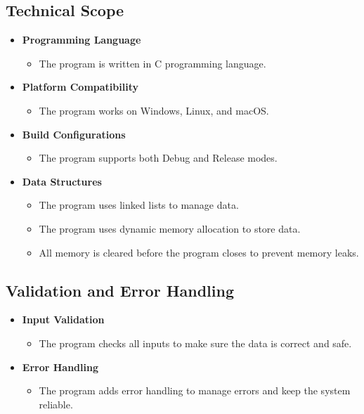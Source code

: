 \documentclass[12pt,a4paper]{report}
\begin{document}
\subsection{Technical Scope}
\begin{itemize}
    \item \normalsize \textbf{Programming Language}
    \begin{itemize}
        \item The program is written in C programming language.
    \end{itemize}
    \item \normalsize \textbf{Platform Compatibility}
    \begin{itemize}
        \item The program works on Windows, Linux, and macOS.\
    \end{itemize}
    \item \normalsize \textbf{Build Configurations}
    \begin{itemize}
        \item The program supports both Debug and Release modes.
    \end{itemize}
    \item \normalsize \textbf{Data Structures}
    \begin{itemize}
        \item The program uses linked lists to manage data.
        \item The program uses dynamic memory allocation to store data.
        \item All memory is cleared before the program closes to prevent memory leaks.
    \end{itemize}
\end{itemize}

\subsection{Validation and Error Handling}
\begin{itemize}
    \item \normalsize \textbf{Input Validation}
    \begin{itemize}
        \item The program checks all inputs to make sure the data is correct and safe.
    \end{itemize}
    \item \normalsize \textbf{Error Handling}
    \begin{itemize}
        \item The program adds error handling to manage errors and keep the system reliable.
    \end{itemize}
\end{itemize}
\end{document}
